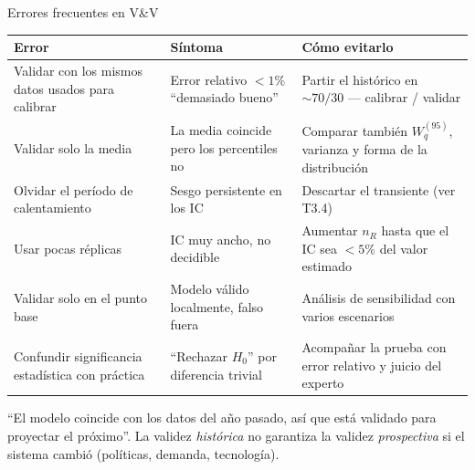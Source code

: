 \documentclass[aspectratio=1610, 10pt]{beamer}
\begin{document}
\begin{frame}{Errores frecuentes en V\&V}
  \begin{center}\footnotesize
    \renewcommand{\arraystretch}{1.3}
    \begin{tabular}{p{4.4cm}p{4.4cm}p{4.6cm}}
      \toprule
      \textbf{Error} & \textbf{Síntoma} & \textbf{Cómo evitarlo} \\
      \midrule
      Validar con los mismos datos usados para calibrar
        & Error relativo $<1\%$ ``demasiado bueno''
        & Partir el histórico en $\sim 70/30$ — calibrar / validar \\
      Validar solo la media
        & La media coincide pero los percentiles no
        & Comparar también $W_q^{(95)}$, varianza y forma de la distribución \\
      Olvidar el período de calentamiento
        & Sesgo persistente en los IC
        & Descartar el transiente (ver T3.4) \\
      Usar pocas réplicas
        & IC muy ancho, no decidible
        & Aumentar $n_R$ hasta que el IC sea $<5\%$ del valor estimado \\
      Validar solo en el punto base
        & Modelo válido localmente, falso fuera
        & Análisis de sensibilidad con varios escenarios \\
      Confundir significancia estadística con práctica
        & ``Rechazar $H_0$'' por diferencia trivial
        & Acompañar la prueba con error relativo y juicio del experto \\
      \bottomrule
    \end{tabular}
  \end{center}

  \vspace{6pt}
  \begin{alertabox}
    \footnotesize
    ``El modelo coincide con los datos del año pasado, así que está validado para
    proyectar el próximo''. La validez \emph{histórica} no garantiza la validez
    \emph{prospectiva} si el sistema cambió (políticas, demanda, tecnología).
  \end{alertabox}
\end{frame}
\end{document}
